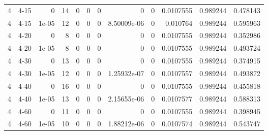 \begin{tabular}{rlrrrrrrrrrr}
     4 & 4-15   &      0     &          14 &                 0 &                 0 &     0           &     0           &      0           &        0.0107555 &               0.989244 &           0.478143 \\
     4 & 4-15   &      1e-05 &          12 &                 0 &                 0 &     0           &     8.50009e-06 &      0           &        0.010764  &               0.989244 &           0.595963 \\
     4 & 4-20   &      0     &           8 &                 0 &                 0 &     0           &     0           &      0           &        0.0107555 &               0.989244 &           0.352986 \\
     4 & 4-20   &      1e-05 &           8 &                 0 &                 0 &     0           &     0           &      0           &        0.0107555 &               0.989244 &           0.493724 \\
     4 & 4-30   &      0     &          13 &                 0 &                 0 &     0           &     0           &      0           &        0.0107555 &               0.989244 &           0.374915 \\
     4 & 4-30   &      1e-05 &          12 &                 0 &                 0 &     0           &     1.25932e-07 &      0           &        0.0107557 &               0.989244 &           0.493872 \\
     4 & 4-40   &      0     &          16 &                 0 &                 0 &     0           &     0           &      0           &        0.0107555 &               0.989244 &           0.455818 \\
     4 & 4-40   &      1e-05 &          13 &                 0 &                 0 &     0           &     2.15655e-06 &      0           &        0.0107577 &               0.989244 &           0.588313 \\
     4 & 4-60   &      0     &          11 &                 0 &                 0 &     0           &     0           &      0           &        0.0107555 &               0.989244 &           0.398945 \\
     4 & 4-60   &      1e-05 &          10 &                 0 &                 0 &     0           &     1.88212e-06 &      0           &        0.0107574 &               0.989244 &           0.543747 \\
\hline
\end{tabular}
